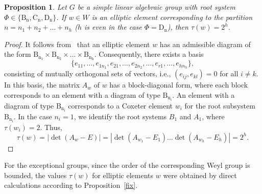 \documentclass[a4paper,12pt]{amsart}
\theoremstyle{plain}
\newtheorem{proposition}{Proposition}
\theoremstyle{definition}
\begin{document}
\begin{proposition}
Let $G$ be a simple linear algebraic group with root system $\Phi\in\{\operatorname{B_n}, \operatorname{C_n}, \operatorname{D_n}\}$. If $w\in W$ is an elliptic element corresponding to the partition $n=n_1+n_2+\ldots+n_h$ ($h$ is even in the case $\Phi=\operatorname{D_n}$), then $\tau(w)=2^h$.
\end{proposition}

\begin{proof}
It follows from~\cite[Proposition~24]{CarWeyl} that an elliptic element $w$ has an admissible diagram of the form $\operatorname{B_{n_1}}\times\operatorname{B_{n_2}}\times\ldots\times\operatorname{B_{n_h}}$. Consequently, there exists a basis $$\{e_{11},\ldots,e_{1n_1}, e_{21},\ldots,e_{2n_2},\ldots,e_{r1},\ldots,e_{hn_h}\},$$ consisting of mutually orthogonal sets of vectors, i.e., $(e_{ij},e_{kl})=0$ for all $i\neq k$. In this basis, the matrix $A_w$ of $w$ has a block-diagonal form, where each block corresponds to an element with a diagram of type $\operatorname{B_{n_i}}$. An element with a diagram of type $\operatorname{B_{n_i}}$ corresponds to a Coxeter element $w_i$ for the root subsystem $\operatorname{B_{n_i}}$. In the case $n_i=1$, we identify the root systems $B_1$ and $A_1$, where $\tau(w_i)=2$. Thus,
$$\tau(w)=|\operatorname{det}(A_w-E)|=|\operatorname{det}(A_{w_1}-E_1)\ldots\operatorname{det}(A_{w_h}-E_h)|=2^h.$$
\end{proof}

For the exceptional groups, since the order of the corresponding Weyl group is bounded, the values $\tau(w)$ for elliptic elements $w$ were obtained by direct calculations according to Proposition~\ref{fix}.
\end{document}
